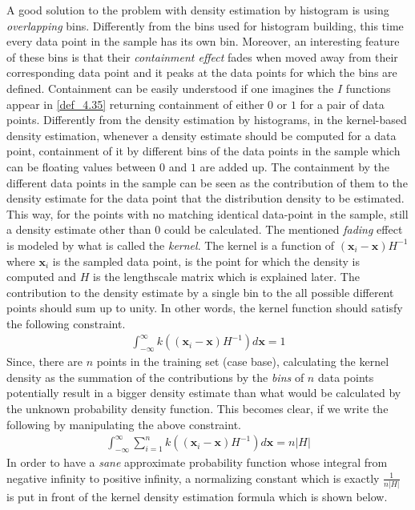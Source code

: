 A good solution to the problem with density estimation by histogram is using \textit{overlapping} bins. Differently from the bins used for histogram building, this time every data point in the sample has its own bin. Moreover, an interesting feature of these bins is that their \textit{containment effect} fades when moved away from their corresponding data point and it peaks at the data points for which the bins are defined. Containment can be easily understood if one imagines the $I$ functions appear in \ref{def_4.35} returning containment of either $0$ or $1$ for a pair of data points. Differently from the density estimation by histograms, in the kernel-based density estimation, whenever a density estimate should be computed for a data point, containment of it by different bins of the data points in the sample which can be floating values between $0$ and $1$ are added up. The containment by the different data points in the sample can be seen as the contribution of them to the density estimate for the data point that the distribution density to be estimated. This way, for the points with no matching identical data-point in the sample, still a density estimate other than $0$ could be calculated. The mentioned \textit{fading} effect is modeled by what is called the \textit{kernel}. The kernel is a function of $(\pmb{x}_i-\pmb{x})H^{-1}$ where $\pmb{x}_i$ is the sampled data point,  is the point for which the density is computed and $H$ is the lengthscale matrix which is explained later. The contribution to the density estimate by a single bin to the all possible different points should sum up to unity. In other words, the kernel function should satisfy the following constraint.
\begin{align*}
\int_{-\infty}^{\infty} k((\pmb{x}_i-\pmb{x})H^{-1})d\pmb{x} = 1
\end{align*}
Since, there are $n$ points in the training set (case base), calculating the kernel density as the summation of the contributions by the \textit{bins} of $n$ data points potentially result in a bigger density estimate than what would be calculated by the unknown probability density function. This becomes clear, if we write the following by manipulating the above constraint.
\begin{align*}
\int_{-\infty}^{\infty} \sum_{i=1}^{n} k((\pmb{x}_i-\pmb{x})H^{-1})d\pmb{x} = n|H|
\end{align*}
In order to have a \textit{sane} approximate probability function whose integral from negative infinity to positive infinity, a normalizing constant which is exactly $\frac{1}{n|H|}$ is put in front of the kernel density estimation formula which is shown below.
